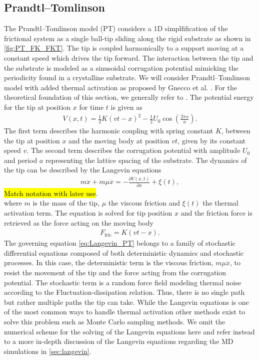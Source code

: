\subsection{Prandtl–Tomlinson} %
The Prandtl–Tomlinson model (\acrshort{PT}) considers a 1D simplfification of
the frictional system as a single ball-tip sliding along the rigid substrate as
shown in \cref{fig:PT_FK_FKT}. The tip is coupled harmonically to a support
moving at a constant speed which drives the tip forward. The interaction between
the tip and the substrate is modeled as a sinusoidal corrugation potential
mimicking the periodicity found in a crystalline substrate. We will consider
Prandtl–Tomlinson model with added thermal activation as proposed by Gnecco et
al. \cite{PhysRevLett.84.1172}. For the theoretical foundation of this section,
we generally refer to \cite{Yalin_2011}. The potential energy for the tip at position $x$ for time $t$ is
given as
\begin{align}
  V(x,t) = \frac{1}{2}K(vt - x)^2 - \frac{1}{2}U_0 \cos \left(\frac{2\pi x}{a} \right).
  \label{eq:V_PT}
\end{align}
The first term describes the harmonic coupling with spring constant $K$, between the tip at position $x$ and the moving body at position $vt$, given by its constant speed $v$. The second term describes the corrugation potential with amplitude $U_0$ and period $a$ representing the lattice spacing of the substrate. The dynamics of the tip can be described by the Langevin equations 
\begin{align}
  m \ddot{x}+m \mu \dot{x}=-\frac{\partial V(x, t)}{\partial x}+\xi(t),
  \label{eq:Langevin_PT}
\end{align}
\hl{Match notation with later use}. \\
where $m$ is the mass of the tip, $\mu$ the viscous friction and $\xi(t)$ the thermal activation term. The equation is solved for tip position $x$ and the friction force is retrieved as the force acting on the moving body
\begin{align*}
  F_{\text{fric}} = K(vt - x).
\end{align*}
The governing equation \cref{eq:Langevin_PT} belongs to a family of stochastic differential equations composed of both deterministic dynamics and stochastic processes. In this case, the deterministic term is the viscous friction, $m\mu\dot{x}$, to resist the movement of the tip and the force acting from the corrugation potential. The stochastic term is a random force field modeling thermal noise according to the Fluctuation-dissipation relation. Thus, there is no single path but rather multiple paths the tip can take. While the Langevin equations is one of the most common ways to handle thermal activation other methods exist to solve this problem such as Monte Carlo sampling methods. We omit the numerical scheme for the solving of the Langevin equations here and refer instead to a more in-depth discussion of the Langevin equations regarding the \acrshort{MD} simulations in \cref{sec:langevin}. 


